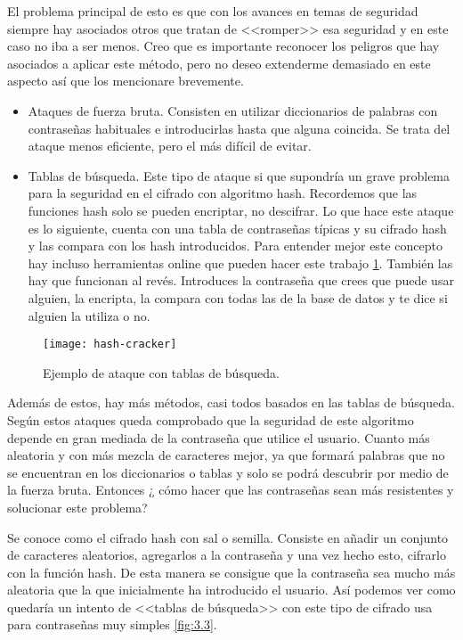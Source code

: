 El problema principal de esto es que con los avances en temas de seguridad siempre hay asociados otros que tratan de <<romper>> esa seguridad y en este caso no iba a ser menos. Creo que es importante reconocer los peligros que hay asociados a aplicar este método, pero no deseo extenderme demasiado en este aspecto así que los mencionare brevemente.


\begin{itemize}
\item Ataques de fuerza bruta. Consisten en utilizar diccionarios de palabras con contraseñas habituales e introducirlas hasta que alguna coincida. Se trata del ataque menos eficiente, pero el más difícil de evitar.
\item Tablas de búsqueda. Este tipo de ataque si que supondría un grave problema para la seguridad en el cifrado con algoritmo hash. Recordemos que las funciones hash solo se pueden encriptar, no descifrar. Lo que hace este ataque es lo siguiente, cuenta con una tabla de contraseñas típicas y su cifrado hash y las compara con los hash introducidos. Para entender mejor este concepto hay incluso herramientas online que pueden hacer este trabajo \ref{fig:3.2}. También las hay que funcionan al revés. Introduces la contraseña que crees que puede usar alguien, la encripta, la compara con todas las de la base de datos y te dice si alguien la utiliza o no.
\end{itemize}

\begin{figure}[h]
\centering
\texttt{[image: hash-cracker]}
\caption{Ejemplo de ataque con tablas de búsqueda.}
\label{fig:3.2}
\end{figure}

Además de estos, hay más métodos, casi todos basados en las tablas de búsqueda. Según estos ataques queda comprobado que la seguridad de este algoritmo depende en gran mediada de la contraseña que utilice el usuario. Cuanto más aleatoria y con más mezcla de caracteres mejor, ya que formará palabras que no se encuentran en los diccionarios o tablas y solo se podrá descubrir por medio de la fuerza bruta. Entonces ¿ cómo hacer que las contraseñas sean más resistentes y solucionar este problema?

Se conoce como el cifrado hash con sal o semilla. Consiste en añadir un conjunto de caracteres aleatorios, agregarlos a la contraseña y una vez hecho esto, cifrarlo con la función hash. De esta manera se consigue que la contraseña sea mucho más aleatoria que la que inicialmente ha introducido el usuario. Así podemos ver como quedaría un intento de <<tablas de búsqueda>> con este tipo de cifrado usa para contraseñas muy simples \ref{fig:3.3}. 

